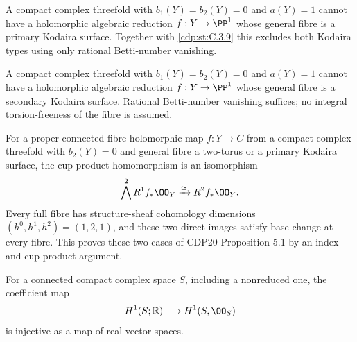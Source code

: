 
\begin{proposition}\hypertarget{tag-01F5}{}\label{cdp:st:C.3.10}



A compact complex threefold with $b_1(Y)=b_2(Y)=0$ and
$a(Y)=1$ cannot have a holomorphic algebraic reduction
$f:Y\to\PP^1$ whose general fibre is a primary Kodaira
surface. Together with \ref{cdp:st:C.3.9} this excludes both Kodaira
types using only rational Betti-number vanishing.
\end{proposition}

\begin{proposition}\hypertarget{tag-01FF}{}\label{cdp:st:C.3.9}



A compact complex threefold with $b_1(Y)=b_2(Y)=0$ and
$a(Y)=1$ cannot have a holomorphic algebraic reduction
$f:Y\to\PP^1$ whose general fibre is a secondary Kodaira
surface. Rational Betti-number vanishing suffices; no integral
torsion-freeness of the fibre is assumed.
\end{proposition}

\begin{proposition}\hypertarget{tag-01FX}{}\label{cdp:st:D.1.12}


For a proper connected-fibre holomorphic map $f:Y\to C$ from a
compact complex threefold with $b_2(Y)=0$ and general fibre a
two-torus or a primary Kodaira surface, the cup-product homomorphism
is an isomorphism
\[
\bigwedge^2R^1f_*\OO_Y\xrightarrow{\simeq}R^2f_*\OO_Y.
\]
Every full fibre has structure-sheaf cohomology dimensions
$(h^0,h^1,h^2)=(1,2,1)$, and these two direct images satisfy
base change at every fibre. This proves these two cases of CDP20
Proposition 5.1 by an index and cup-product argument.
\end{proposition}

\begin{proposition}\hypertarget{tag-01G5}{}\label{cdp:st:D.1.7}


For a connected compact complex space $S$, including a nonreduced
one, the coefficient map
\[
H^1(S;\mathbb R)\longrightarrow H^1(S,\OO_S)
\]
is injective as a map of real vector spaces.
\end{proposition}

